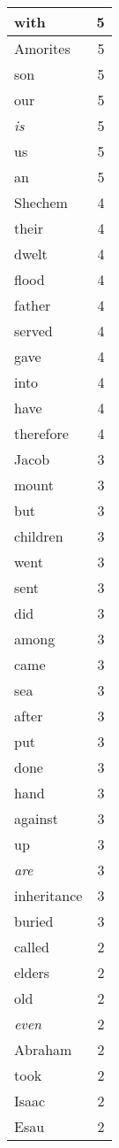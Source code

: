 \begin{center}
\begin{longtable}{l|r}
with & 5\\ \hline 
Amorites & 5\\ \hline 
son & 5\\ \hline 
our & 5\\ \hline 
\emph{is} & 5\\ \hline 
us & 5\\ \hline 
an & 5\\ \hline 
Shechem & 4\\ \hline 
their & 4\\ \hline 
dwelt & 4\\ \hline 
flood & 4\\ \hline 
father & 4\\ \hline 
served & 4\\ \hline 
gave & 4\\ \hline 
into & 4\\ \hline 
have & 4\\ \hline 
therefore & 4\\ \hline 
Jacob & 3\\ \hline 
mount & 3\\ \hline 
but & 3\\ \hline 
children & 3\\ \hline 
went & 3\\ \hline 
sent & 3\\ \hline 
did & 3\\ \hline 
among & 3\\ \hline 
came & 3\\ \hline 
sea & 3\\ \hline 
after & 3\\ \hline 
put & 3\\ \hline 
done & 3\\ \hline 
hand & 3\\ \hline 
against & 3\\ \hline 
up & 3\\ \hline 
\emph{are} & 3\\ \hline 
inheritance & 3\\ \hline 
buried & 3\\ \hline 
called & 2\\ \hline 
elders & 2\\ \hline 
old & 2\\ \hline 
\emph{even} & 2\\ \hline 
Abraham & 2\\ \hline 
took & 2\\ \hline 
Isaac & 2\\ \hline 
Esau & 2\\ \hline 

\end{longtable}
\end{center}
